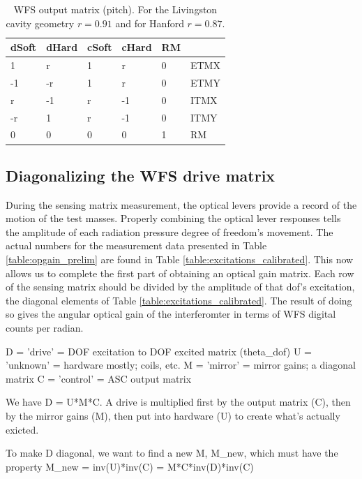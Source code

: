 \begin{table}
\centering
\caption{WFS output matrix (pitch). For the Livingston cavity geometry
  $r=0.91$ and for Hanford $r=0.87$.}
\begin{tabular}{l l l l l l}
\hline 
dSoft & dHard & cSoft & cHard & RM & \\
\hline 
1 & r & 1 & r & 0 & ETMX\\
-1 & -r & 1 & r & 0 & ETMY \\
r & -1 & r & -1 & 0 & ITMX\\
-r & 1 & r & -1 & 0 & ITMY\\
 0 & 0 & 0 & 0 & 1 & RM\\
\hline
\end{tabular}
\label{table:output}
\end{table}


\subsection{Diagonalizing the WFS drive matrix}

During the sensing matrix measurement, the optical levers provide a
record of the motion of the test masses. Properly combining the
optical lever responses tells the amplitude of each radiation pressure
degree of freedom's movement. The actual
numbers for the measurement data presented in Table
\ref{table:opgain_prelim} are found in Table
\ref{table:excitations_calibrated}. This now allows us to complete the
first part of obtaining an optical gain matrix. Each row of the
sensing matrix should be divided by the amplitude of that dof's
excitation, the diagonal elements of Table
\ref{table:excitations_calibrated}. The result of doing so gives the
angular optical gain of the interferomter in terms of WFS digital
counts per radian.



D = 'drive' = DOF excitation to DOF excited matrix (theta\_dof)
U = 'unknown' = hardware mostly; coils, etc.
M = 'mirror' = mirror gains; a diagonal matrix
C = 'control' = ASC output matrix

We have D = U*M*C. A drive is multiplied first by the output matrix (C),
then by the mirror gains (M), then put into hardware (U) to create what's
actually exicted.

To make D diagonal, we want to find a new M, M\_new, which must have the
property M\_new = inv(U)*inv(C) = M*C*inv(D)*inv(C)


